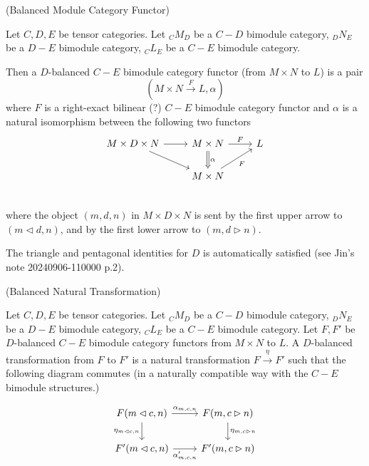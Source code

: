 \begin{definition} (Balanced Module Category Functor)

  \noindent Let $C, D, E$ be tensor categories. Let $_{C}M_{D}$ be a $C-D$
  bimodule category, $_{D}N_{E}$ be a $D-E$ bimodule category, $_{C}L_{E}$ be a $C-E$ bimodule category.

  \noindent Then a $D$-balanced $C-E$ bimodule category functor (from $M \times N$ to $L$) is a pair
  \[(M \times N \xrightarrow{F} L, \alpha)\]
  where $F$ is a right-exact bilinear (?) $C-E$ bimodule category functor and $\alpha$ is a natural isomorphism between the following two functors
  \[
    \begin{tikzcd}
      M \times D \times N \arrow[r] \arrow[dr] &
      M \times N \arrow[d, Rightarrow, "\alpha"] \arrow[r, "F"] &
      L \\
      & M \times N \arrow[ur, "F"'] \\
    \end{tikzcd}
  \]
  where the object $(m,d,n)$ in $M \times D \times N$ is sent by the first
  upper arrow to $(m \lhd d, n)$, and by the first lower arrow to $(m, d \rhd n)$.
\end{definition}

\begin{remark}
  The triangle and pentagonal identities for $D$ is automatically satisfied
  (see Jin's note 20240906-110000 p.2).
\end{remark}

\begin{definition} (Balanced Natural Transformation)

  \noindent Let $C, D, E$ be tensor categories. Let $_{C}M_{D}$ be a $C-D$
  bimodule category, $_{D}N_{E}$ be a $D-E$ bimodule category, $_{C}L_{E}$ be
  a $C-E$ bimodule category. Let $F, F'$ be $D$-balanced $C-E$ bimodule
  category functors from $M \times N$ to $L$. A $D$-balanced transformation
  from $F$ to $F'$ is a natural transformation $ F \xrightarrow{\eta} F'$ such
  that the following diagram commutes (in a naturally compatible way with the
  $C-E$ bimodule structures.)

  \[
    \begin{tikzcd}
      F(m \lhd c, n) \arrow[r, "\alpha_{m,c,n}"] \arrow[d, "\eta_{m \lhd c, n}"'] &
      F(m, c \rhd n) \arrow[d, "\eta_{m, c \rhd n}"] \\
      F'(m \lhd c, n) \arrow[r, "\alpha_{m,c,n}'"'] &
      F'(m, c \rhd n)
    \end{tikzcd}
  \]
\end{definition}

